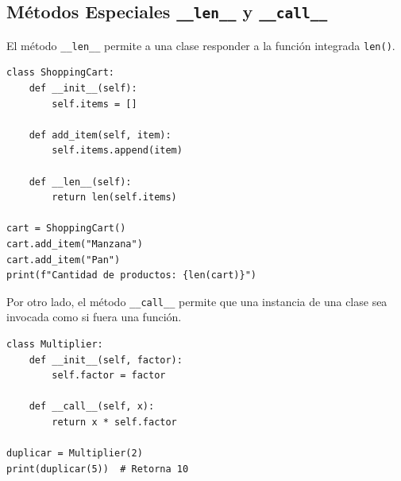 \subsection{Métodos Especiales \texttt{\_\_len\_\_} y \texttt{\_\_call\_\_}}
El método \texttt{\_\_len\_\_} permite a una clase responder a la función integrada \texttt{len()}.

\begin{lstlisting}[caption={Uso de \texttt{\_\_len\_\_} para calcular la cantidad de elementos.}, label={list:cart_len}]
class ShoppingCart:
    def __init__(self):
        self.items = []

    def add_item(self, item):
        self.items.append(item)

    def __len__(self):
        return len(self.items)

cart = ShoppingCart()
cart.add_item("Manzana")
cart.add_item("Pan")
print(f"Cantidad de productos: {len(cart)}")
\end{lstlisting}

Por otro lado, el método \texttt{\_\_call\_\_} permite que una instancia de una clase sea invocada como si fuera una función.

\begin{lstlisting}[caption={Instancia invocable con \texttt{\_\_call\_\_}.}, label={list:call_method}]
class Multiplier:
    def __init__(self, factor):
        self.factor = factor

    def __call__(self, x):
        return x * self.factor

duplicar = Multiplier(2)
print(duplicar(5))  # Retorna 10
\end{lstlisting}
